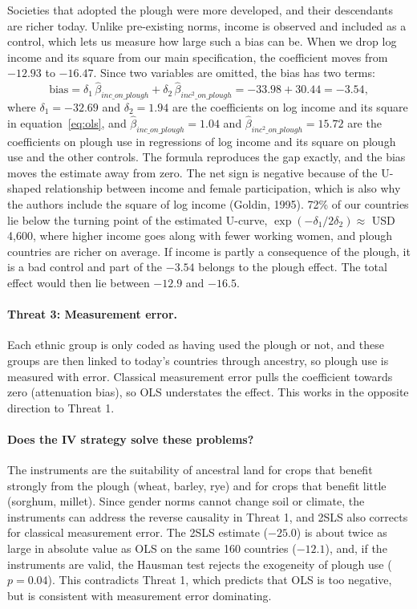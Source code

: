 \documentclass[12pt,a4paper]{article}
\begin{document}
Societies that adopted the plough were more developed, and their descendants are richer today. Unlike pre-existing norms, income is observed and included as a control, which lets us measure how large such a bias can be. When we drop log income and its square from our main specification, the coefficient moves from $-12.93$ to $-16.47$. Since two variables are omitted, the bias has two terms:
\[
\text{bias} = \delta_1 \, \hat\beta_{inc\_on\_plough} + \delta_2 \, \hat\beta_{inc^2\_on\_plough} = -33.98 + 30.44 = -3.54 ,
\]
where $\delta_1 = -32.69$ and $\delta_2 = 1.94$ are the coefficients on log income and its square in equation~\eqref{eq:ols}, and $\hat\beta_{inc\_on\_plough} = 1.04$ and $\hat\beta_{inc^2\_on\_plough} = 15.72$ are the coefficients on plough use in regressions of log income and its square on plough use and the other controls. The formula reproduces the gap exactly, and the bias moves the estimate away from zero. The net sign is negative because of the U-shaped relationship between income and female participation, which is also why the authors include the square of log income (Goldin, 1995). 72\% of our countries lie below the turning point of the estimated U-curve, $\exp(-\delta_1 / 2\delta_2) \approx$ USD 4,600, where higher income goes along with fewer working women, and plough countries are richer on average. If income is partly a consequence of the plough, it is a bad control and part of the $-3.54$ belongs to the plough effect. The total effect would then lie between $-12.9$ and $-16.5$.

\paragraph{Threat 3: Measurement error.}

Each ethnic group is only coded as having used the plough or not, and these groups are then linked to today's countries through ancestry, so plough use is measured with error. Classical measurement error pulls the coefficient towards zero (attenuation bias), so OLS understates the effect. This works in the opposite direction to Threat 1.

\paragraph{Does the IV strategy solve these problems?}

The instruments are the suitability of ancestral land for crops that benefit strongly from the plough (wheat, barley, rye) and for crops that benefit little (sorghum, millet). Since gender norms cannot change soil or climate, the instruments can address the reverse causality in Threat 1, and 2SLS also corrects for classical measurement error. The 2SLS estimate ($-25.0$) is about twice as large in absolute value as OLS on the same 160 countries ($-12.1$), and, if the instruments are valid, the Hausman test rejects the exogeneity of plough use ($p = 0.04$). This contradicts Threat 1, which predicts that OLS is too negative, but is consistent with measurement error dominating.
\end{document}
